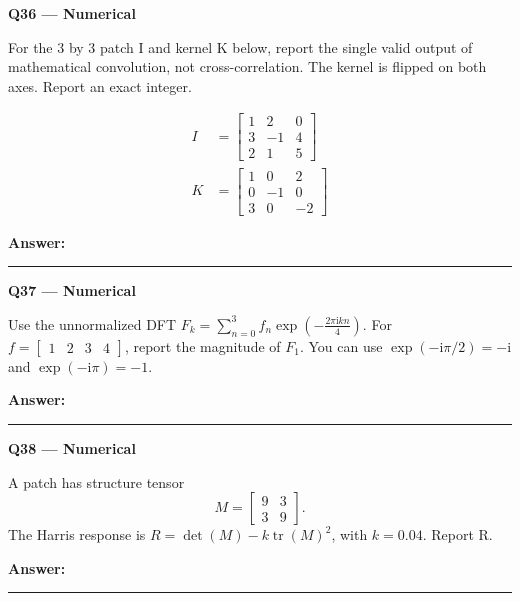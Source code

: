 \documentclass[11pt,a4paper]{article}
\begin{document}
\par\vspace{12pt}
\begin{minipage}{\linewidth}
\textbf{Q36 — Numerical}\par\smallskip
For the 3 by 3 patch I and kernel K below,\allowbreak{} report the single valid output of mathematical convolution,\allowbreak{} not cross-correlation. The kernel is flipped on both axes. Report an exact integer.


\[
\begin{aligned}I&=\begin{bmatrix}1&2&0\\3&-1&4\\2&1&5\end{bmatrix}\\[6pt]K&=\begin{bmatrix}1&0&2\\0&-1&0\\3&0&-2\end{bmatrix}\end{aligned}
\]

\par\medskip\textbf{Answer:} \rule{55mm}{0.4pt}
\end{minipage}
\par\vspace{12pt}
\begin{minipage}{\linewidth}
\textbf{Q37 — Numerical}\par\smallskip
Use the unnormalized DFT \(F_k=\sum_{n=0}^{3}f_n\exp\!\left(-\frac{2\pi\mathrm{i}kn}{4}\right)\). For \(f=\begin{bmatrix}1&2&3&4\end{bmatrix}\),\allowbreak{} report the magnitude of \(F_1\). You can use \(\exp(-\mathrm{i}\pi/2)=-\mathrm{i}\) and \(\exp(-\mathrm{i}\pi)=-1\).
\par\medskip\textbf{Answer:} \rule{55mm}{0.4pt}
\end{minipage}
\par\vspace{12pt}
\begin{minipage}{\linewidth}
\textbf{Q38 — Numerical}\par\smallskip
A patch has structure tensor
\[M=\begin{bmatrix}9&3\\3&9\end{bmatrix}.\]
 The Harris response is \(R=\det(M)-k\operatorname{tr}(M)^2\),\allowbreak{} with \(k=0.04\). Report R.
\par\medskip\textbf{Answer:} \rule{55mm}{0.4pt}
\end{minipage}
\end{document}
